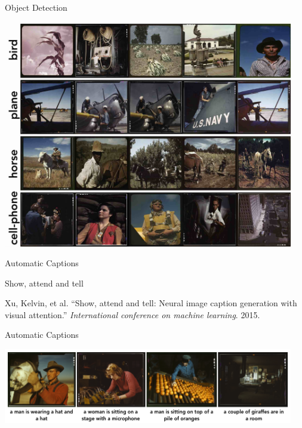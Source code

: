 \documentclass[12pt,ignorenonframetext,aspectratio=169]{beamer}
\makeatletter
\newcommand{\orange}[1]{\textcolor{solarized@orange}{#1}}
\makeatother
\begin{document}
\begin{frame}{Object Detection}

\begin{center}
\includegraphics[width=0.95\textwidth]{../figures/max_things_grid_labels_small_bottom.jpg}
\end{center}

\end{frame}

\begin{frame}{Automatic Captions}

\orange{Show, attend and tell}

Xu, Kelvin, et al. ``Show, attend and tell: Neural image caption generation with visual
attention.'' \textit{International conference on machine learning}. 2015.

\end{frame}

\begin{frame}{Automatic Captions}

\begin{center}
\includegraphics[width=0.95\textwidth]{../figures/captions.png}
\end{center}

\end{frame}
\end{document}
